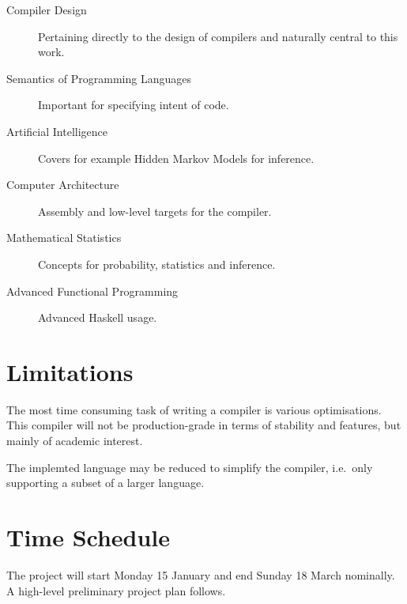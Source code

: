 \documentclass[a4paper, parskip]{scrartcl}
\begin{document}
\begin{description}
  \item[Compiler Design] Pertaining directly to the design of compilers
    and naturally central to this work.

  \item[Semantics of Programming Languages] Important for specifying
    intent of code.

  \item[Artificial Intelligence] Covers for example Hidden Markov Models for
    inference.

  \item[Computer Architecture] Assembly and low-level targets for the compiler.


  \item[Mathematical Statistics] Concepts for probability, statistics and
    inference.


  \item[Advanced Functional Programming] Advanced Haskell usage.
\end{description}

\section{Limitations}
\label{sec:limitations}

The most time consuming task of writing a compiler is various optimisations.
This compiler will not be production-grade in terms of stability and features,
but mainly of academic interest.

The implemted language may be reduced to simplify the compiler, i.e.\ only
supporting a subset of a larger language.


\section{Time Schedule}
\label{sec:time_schedule}

The project will start Monday 15 January and end Sunday 18 March nominally. A
high-level preliminary project plan follows.
\end{document}
